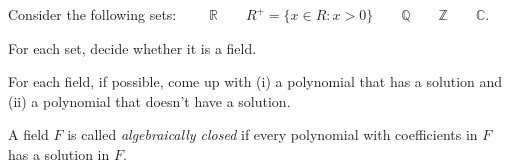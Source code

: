 \documentclass[14pt]{problemset}
\newcommand{\R}{\mathbb{R}}
\newcommand{\Z}{\mathbb{Z}}
\newcommand{\Q}{\mathbb{Q}}
\newcommand{\C}{\mathbb{C}}
\begin{document}
	\question
	Consider the following sets:
	$
		\qquad\R\qquad R^+=\{x\in R:x>0\}\qquad \Q\qquad \Z\qquad \C.
	$
	\begin{parts}
		\item For each set, decide whether it is a field.
		\item For each field, if possible, come up with (i) a polynomial that has a solution
			and (ii) a polynomial that doesn't have a solution.
	\end{parts}
	\begin{definition}
		A field $F$ is called \emph{algebraically closed} if every polynomial with
		coefficients in $F$ has a solution in $F$.
	\end{definition}
\end{document}

